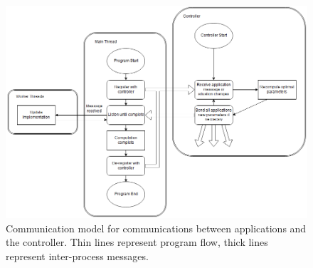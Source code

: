 \begin{figure}
	\centering
	\includegraphics[width=1.1\textwidth]{graphics/controller_communication_flowchart.png}
	\caption{Communication model for communications between applications and the controller. Thin lines represent program flow, thick lines represent inter-process messages.}
	\label{fig:controller_flowchart}
\end{figure}



